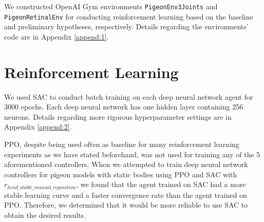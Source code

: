 We constructed OpenAI Gym \cite{brockman2016openai} environments \lstinline|PigeonEnv3Joints| and \lstinline|PigeonRetinalEnv| for conducting reinforcement learning based on the baseline and preliminary hypotheses, respectively.
  Details regarding the environments' code are in Appendix \ref{append:1}.

\section{Reinforcement Learning}
We used SAC to conduct batch training on each deep neural network agent for 3000 epochs. Each deep neural network has one hidden layer containing 256 neurons. Details regarding more rigorous hyperparameter settings are in Appendix \ref{append:2}.

  PPO, despite being used often as baseline for many reinforcement learning experiments as we have stated beforehand, was not used for training any of the 5 aforementioned controllers.
  When we attempted to train deep neural network controllers for pigeon models with static bodies using PPO and SAC with $r_{head\_stable\_manual\_reposition}$, we found that the agent trained on SAC had a more stable learning curve and a faster convergence rate than the agent trained on PPO.
  Therefore, we determined that it would be more reliable to use SAC to obtain the desired results.
